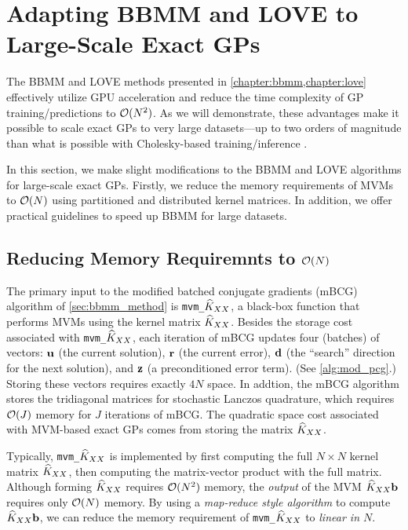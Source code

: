 \section{Adapting BBMM and LOVE to Large-Scale Exact GPs}
\label{sec:largeexact_method}

The BBMM and LOVE methods presented in \cref{chapter:bbmm,chapter:love} effectively utilize GPU acceleration and reduce the time complexity of GP training/predictions to $\bigo{N^2}$.
As we will demonstrate, these advantages make it possible to scale exact GPs to very large datasets---up to two orders of magnitude than what is possible with Cholesky-based training/inference \cite{nguyen2019exact}.

In this section, we make slight modifications to the BBMM and LOVE algorithms for large-scale exact GPs.
Firstly, we reduce the memory requirements of MVMs to $\bigo{N}$ using partitioned and distributed kernel matrices.
In addition, we offer practical guidelines to speed up BBMM for large datasets.




\subsection{Reducing Memory Requiremnts to $\bigo{N}$}

The primary input to the modified batched conjugate gradients (mBCG) algorithm of \cref{sec:bbmm_method} is {\tt mvm\_$\widehat{K}_{XX}$}, a black-box function that performs MVMs using the kernel matrix $\widehat{K}_{XX}$.
Besides the storage cost associated with {\tt mvm\_$\widehat{K}_{XX}$}, each iteration of mBCG updates four (batches) of vectors: $\mathbf{u}$ (the current solution), $\mathbf{r}$ (the current error), $\mathbf{d}$ (the ``search'' direction for the next solution), and $\mathbf{z}$ (a preconditioned error term).
(See \cref{alg:mod_pcg}.)
Storing these vectors requires exactly $4N$ space.
In addtion, the mBCG algorithm stores the tridiagonal matrices for stochastic Lanczos quadrature, which requires $\bigo{J}$ memory for $J$ iterations of mBCG.
The quadratic space cost associated with MVM-based exact GPs comes from storing the matrix $\widehat{K}_{XX}$.

Typically, {\tt mvm\_$\widehat{K}_{XX}$} is implemented by first computing the full $N \times N$ kernel matrix $\widehat{K}_{XX}$, then computing the matrix-vector product with the full matrix.
Although forming $\widehat{K}_{XX}$ requires $\bigo{N^2}$ memory, the \emph{output} of the MVM $\widehat{K}_{XX} \mathbf{b}$ requires only $\bigo{N}$ memory.
By using a \emph{map-reduce style algorithm} to compute $\widehat{K}_{XX} \mathbf{b}$, we can reduce the memory requirement of {\tt mvm\_$\widehat{K}_{XX}$} to \emph{linear in $N$}.


